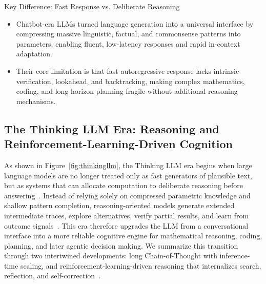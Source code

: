 \begin{AIbox}{Key Difference: Fast Response vs. Deliberate Reasoning}
    \begin{itemize}[left=2pt,topsep=1pt,itemsep=2pt, parsep=1pt]
        \item Chatbot-era LLMs turned language generation into a universal interface by compressing massive linguistic, factual, and commonsense patterns into parameters, enabling fluent, low-latency responses and rapid in-context adaptation.

        \item Their core limitation is that fast autoregressive response lacks intrinsic verification, lookahead, and backtracking, making complex mathematics, coding, and long-horizon planning fragile without additional reasoning mechanisms.
    \end{itemize}
\end{AIbox}

\subsection{The Thinking LLM Era: Reasoning and Reinforcement-Learning-Driven Cognition}

As shown in Figure~\ref{fig:thinkingllm}, the Thinking LLM era begins when large language models are no longer treated only as fast generators of plausible text, but as systems that can allocate computation to deliberate reasoning before answering~\citep{fricke2026framework,tan2024thought,praas2023self,yao2023tree,vacareanu2024general}.
Instead of relying solely on compressed parametric knowledge and shallow pattern completion, reasoning-oriented models generate extended intermediate traces, explore alternatives, verify partial results, and learn from outcome signals~\citep{chiu2024r,liao2026research,hu2024unveiling,chen2026cap,zhang2024chain}.
This era therefore upgrades the LLM from a conversational interface into a more reliable cognitive engine for mathematical reasoning, coding, planning, and later agentic decision making.
We summarize this transition through two intertwined developments: long Chain-of-Thought with inference-time scaling, and reinforcement-learning-driven reasoning that internalizes search, reflection, and self-correction~\citep{peng2025revisiting,chen2024not,li2025think,sui2025stop,wangefficient,zhang-etal-2024-wrong,11209984,liu2026letsthinkimagesefficiently}.




